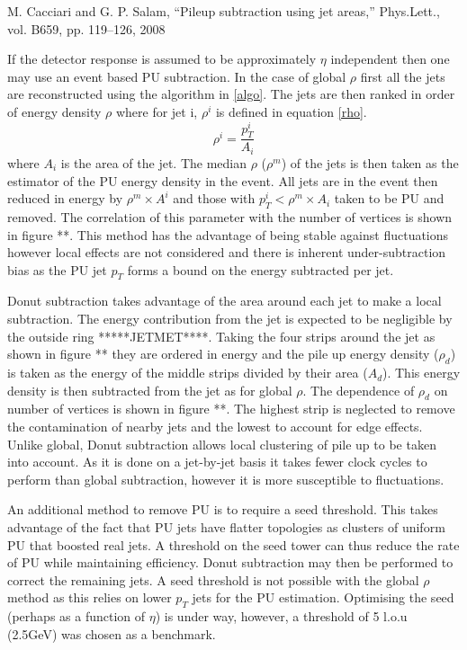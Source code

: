 M. Cacciari and G. P. Salam, “Pileup subtraction using jet areas,” Phys.Lett., vol. B659, pp. 119–126, 2008

If the detector response is assumed to be approximately $\eta$ independent then one may use an event based PU subtraction. In the case of global $\rho$ first all the jets are reconstructed using the algorithm in \ref{algo}. The jets are then ranked in order of energy density $\rho$ where for jet i, $\rho^i$ is defined in equation \ref{rho}.
\begin{equation}
\label{rho}
\rho^i = \frac{p^i_{T}}{A_i} 
\end{equation}
where $A_i$ is the area of the jet. The median $\rho$ ($\rho^m$) of the jets is then taken as the estimator of the PU energy density in the event. All jets are in the event then reduced in energy by $\rho^m \times A^i$ and those with $p_{T}^i < \rho^m \times A_i$ taken to be PU and removed. The correlation of this parameter with the number of vertices is shown in figure **. This method has the advantage of being stable against fluctuations however local effects are not considered and there is inherent under-subtraction bias as the PU jet $p_{T}$ forms a bound on the energy subtracted per jet.

Donut subtraction takes advantage of the area around each jet to make a local subtraction. The energy contribution from the jet is expected to be negligible by the outside ring *****JETMET****. Taking the four strips around the jet as shown in figure ** they are ordered in energy and the pile up energy density ($\rho_d$) is taken as the energy of the middle strips divided by their area ($A_d$). This energy density is then subtracted from the jet as for global $\rho$. The dependence of $\rho_d$ on number of vertices is shown in figure **. The highest strip is neglected to remove the contamination of nearby jets and the lowest to account for edge effects. Unlike global, Donut subtraction allows local clustering of pile up to be taken into account. As it is done on a jet-by-jet basis it takes fewer clock cycles to perform than global subtraction, however it is more susceptible to fluctuations.

An additional method to remove PU is to require a seed threshold. This takes advantage of the fact that PU jets have flatter topologies as clusters of uniform PU that boosted real jets. A threshold on the seed tower can thus reduce the rate of PU while maintaining efficiency. Donut subtraction may then be performed to correct the remaining jets. A seed threshold is not possible with the global $\rho$ method as this relies on lower $p_{T}$ jets for the PU estimation. Optimising the seed (perhaps as a function of $\eta$) is under way, however, a threshold of 5 l.o.u (2.5GeV) was chosen as a benchmark.  
